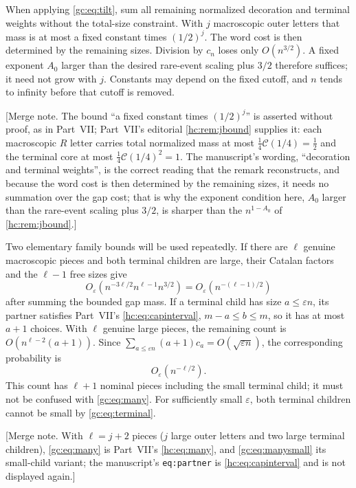 \documentclass[11pt,a4paper]{article}
\theoremstyle{definition}\newaliascnt{definition}{theorem}
\theoremstyle{remark}\newaliascnt{remark}{theorem}
\newcommand{\Cat}{\mathcal C}
\begin{document}
When applying \eqref{gc:eq:tilt}, sum all remaining normalized decoration and
terminal weights without the total-size constraint. With $j$ macroscopic outer
letters that mass is at most a fixed constant times $(1/2)^j$. The word cost is
then determined by the remaining sizes. Division by $c_n$ loses only
$O(n^{3/2})$. A fixed exponent $A_0$ larger than the desired rare-event scaling
plus $3/2$ therefore suffices; it need not grow with $j$. Constants may depend
on the fixed cutoff, and $n$ tends to infinity before that cutoff is removed.

[Merge note. The bound ``a fixed constant times $(1/2)^j$'' is asserted
without proof, as in Part~VII; Part~VII's editorial \cref{hc:rem:jbound}
supplies it: each macroscopic $R$ letter carries total normalized mass at most
$\tfrac14\Cat(1/4)=\tfrac12$ and the terminal core at most
$\tfrac14\Cat(1/4)^2=1$. The manuscript's wording, ``decoration and terminal
weights'', is the correct reading that the remark reconstructs, and because the
word cost is then determined by the remaining sizes, it needs no summation over
the gap cost; that is why the exponent condition here, $A_0$ larger than the
rare-event scaling plus $3/2$, is sharper than the $n^{1-A_0}$ of
\cref{hc:rem:jbound}.]

Two elementary family bounds will be used repeatedly. If there are $\ell$
genuine macroscopic pieces and both terminal children are large, their Catalan
factors and the $\ell-1$ free sizes give
\begin{equation}\label{gc:eq:many}
 O_\varepsilon(n^{-3\ell/2}n^{\ell-1}n^{3/2})
 =O_\varepsilon(n^{-(\ell-1)/2})
\end{equation}
after summing the bounded gap mass. If a terminal child has size
$a\le\varepsilon n$, its partner satisfies Part~VII's \eqref{hc:eq:capinterval},
$m-a\le b\le m$, so it has at most $a+1$ choices. With $\ell$ genuine large
pieces, the remaining count is $O(n^{\ell-2}(a+1))$. Since
$\sum_{a\le\varepsilon n}(a+1)c_a=O(\sqrt{\varepsilon n})$,
the corresponding probability is
\begin{equation}\label{gc:eq:manysmall}
 O_\varepsilon(n^{-\ell/2}).
\end{equation}
This count has $\ell+1$ nominal pieces including the small terminal child; it
must not be confused with \eqref{gc:eq:many}. For sufficiently small
$\varepsilon$, both terminal children cannot be small by
\eqref{gc:eq:terminal}.

[Merge note. With $\ell=j+2$ pieces ($j$ large outer letters and two large
terminal children), \eqref{gc:eq:many} is Part~VII's \eqref{hc:eq:many}, and
\eqref{gc:eq:manysmall} its small-child variant; the manuscript's
\texttt{eq:partner} is \eqref{hc:eq:capinterval} and is not displayed
again.]
\end{document}
